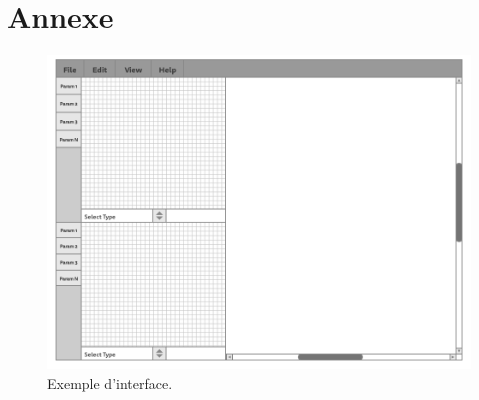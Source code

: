 \documentclass{scrartcl}
\begin{document}
\newpage
\section*{Annexe}

	\begin{figure}[!h]
		\includegraphics[width=\textwidth]{../Images/example_ihm.png}
		\caption{Exemple d'interface.}
	\end{figure}
\end{document}
